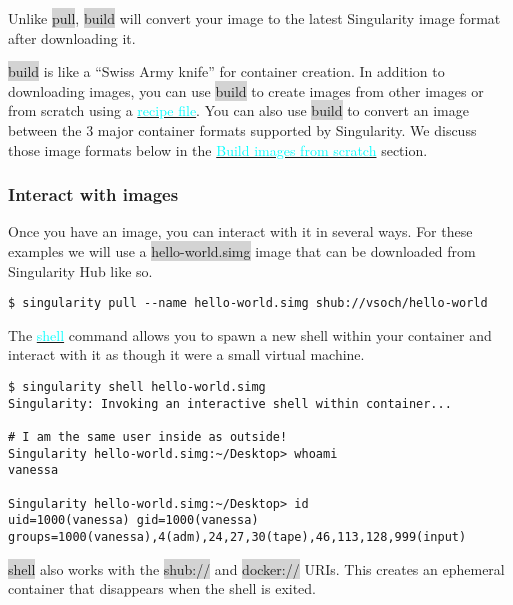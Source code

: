 \documentclass[a4paper]{article}
\newcounter{subsubsubsection}[subsubsection]
\begin{document}
Unlike \colorbox{lightgray}{pull}, \colorbox{lightgray}{build} will convert your image to the latest Singularity image format after downloading it.

\colorbox{lightgray}{build} is like a “Swiss Army knife” for container creation. In addition to downloading images, you can use \colorbox{lightgray}{build} to create images from other images or from scratch using a  \hyperref[sec:recipefile]{{\textcolor{cyan}{recipe file}}}. You can also use \colorbox{lightgray}{build} to convert an image between the 3 major container formats supported by Singularity. We discuss those image formats below in the \hyperref[sec:buildimagesfromscratch]{{\textcolor{cyan}{Build images from scratch}}} section.


\subsubsection{Interact with images}

Once you have an image, you can interact with it in several ways. For these examples we will use a \colorbox{lightgray}{hello-world.simg} image that can be downloaded from Singularity Hub like so.

\begin{lstlisting}[frame=single]  
$ singularity pull --name hello-world.simg shub://vsoch/hello-world
\end{lstlisting}


The  \hyperref[sec:shell]{{\textcolor{cyan}{shell}}} command allows you to spawn a new shell within your container and interact with it as though it were a small virtual machine.

\begin{lstlisting}[frame=single]  
$ singularity shell hello-world.simg
Singularity: Invoking an interactive shell within container...

# I am the same user inside as outside!
Singularity hello-world.simg:~/Desktop> whoami
vanessa

Singularity hello-world.simg:~/Desktop> id
uid=1000(vanessa) gid=1000(vanessa) groups=1000(vanessa),4(adm),24,27,30(tape),46,113,128,999(input)
\end{lstlisting}

\colorbox{lightgray}{shell} also works with the \colorbox{lightgray}{shub://} and \colorbox{lightgray}{docker://} URIs. This creates an ephemeral container that disappears when the shell is exited.
\end{document}
